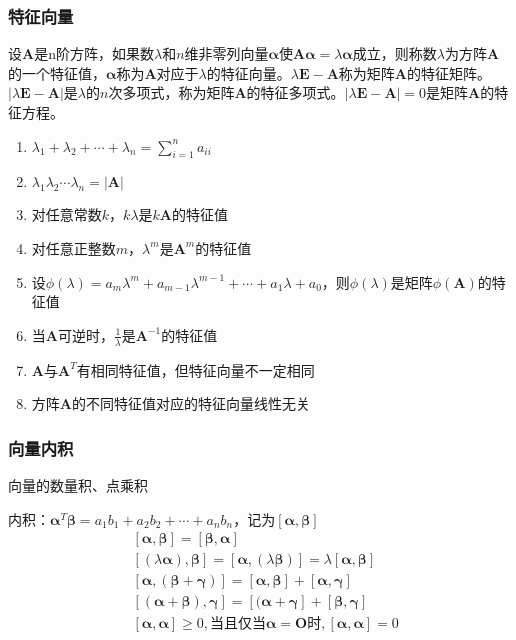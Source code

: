 \documentclass[12pt]{book}
\begin{document}
\subsubsection{特征向量}



设$\bm{A}$是n阶方阵，如果数$\lambda$和$n$维非零列向量$\bm{\alpha}$使$\bm{A \alpha}= \lambda \bm{\alpha}$成立，则称数$\lambda$为方阵$\bm{A}$的一个特征值，$\bm{\alpha}$称为$\bm{A}$对应于$\lambda$的特征向量。$\lambda \bm{E}-\bm{A}$称为矩阵$\bm{A}$的特征矩阵。$|\lambda\bm{E}-\bm{A}|$是$\lambda$的$n$次多项式，称为矩阵$\bm{A}$的特征多项式。$|\lambda\bm{E}-\bm{A}|=0$是矩阵$\bm{A}$的特征方程。


\begin{enumerate}[(1)]
    \item $\lambda_1+\lambda_2+\cdots+\lambda_n=\sum_{i=1}^{n}{a_{ii}}$
    \item $\lambda_{1}\lambda_{2}\cdots\lambda_{n}=|\bm{A}|$
    \item 对任意常数$k$，$k\lambda$是$k\bm{A}$的特征值 
    \item 对任意正整数$m$，$\lambda^m$是$\bm{A}^m$的特征值 
    \item 设$\phi(\lambda)=a_{m}\lambda^{m}+a_{m-1}\lambda^{m-1}+\cdots+a_{1}\lambda+a_{0}$，则$\phi(\lambda)$是矩阵$\phi(\bm{A})$的特征值
    \item 当$\bm{A}$可逆时，$\frac{1}{\lambda}$是$\bm{A}^{-1}$的特征值
    \item $\bm{A}$与$\bm{A}^T$有相同特征值，但特征向量不一定相同
    \item 方阵$\bm{A}$的不同特征值对应的特征向量线性无关
\end{enumerate}



\subsubsection{向量内积}


向量的数量积、点乘积

内积：$\bm{\alpha}^T\bm{\beta}=a_1 b_1 +a_2 b_2+\cdots+a_n b_n$，记为$[\bm{\alpha},\bm{\beta}]$
\begin{align*}
     & [\bm{\alpha},\bm{\beta}] = [\bm{\beta},\bm{\alpha}]                                                      \\
     & [(\lambda \bm{\alpha}),\bm{\beta}] = [\bm{\alpha},(\lambda\bm{\beta})] = \lambda[\bm{\alpha},\bm{\beta}] \\
     & [\bm{\alpha},(\bm{\beta}+\bm{\gamma})] = [\bm{\alpha},\bm{\beta}]+[\bm{\alpha},\bm{\gamma}]              \\
     & [(\bm{\alpha}+\bm{\beta}),\bm{\gamma}] = [(\bm{\alpha}+\bm{\gamma}]+[\bm{\beta},\bm{\gamma}]             \\
     & [\bm{\alpha},\bm{\alpha}]\geqslant 0, \text{当且仅当}\bm{\alpha}=\bm{O}\text{时},[\bm{\alpha},\bm{\alpha}]=0
\end{align*}
\end{document}
